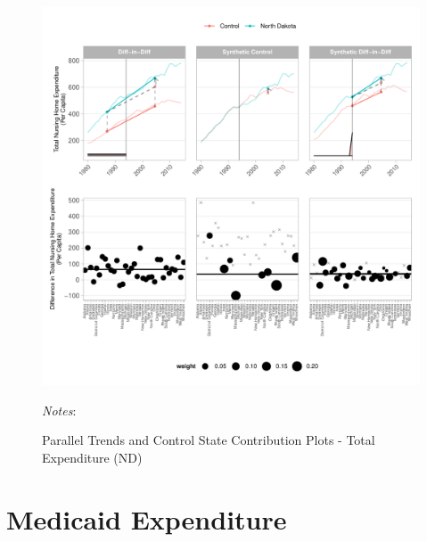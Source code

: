 \documentclass[12pt]{article}
\begin{document}
\newpage
\begin{figure}[t]
	\begin{center}
	\caption{\centering Parallel Trends and Control State Contribution Plots - Total Expenditure (ND)}
    \includegraphics[width=\textwidth,keepaspectratio]{total_expenditure_plots_ND.pdf}
    \end{center}
    \footnotesize
		\textit{Notes}:
\end{figure}
\clearpage

\newpage



\clearpage



\newpage
\vspace*{8cm}
\section{Medicaid Expenditure}
\clearpage
\end{document}
